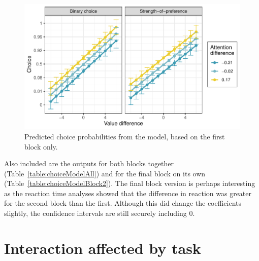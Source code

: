 \documentclass[12pt]{article}
\begin{document}




\begin{figure}
	\includegraphics{images/predictedChoiceGraph}
	\caption{Predicted choice probabilities from the model, based on the first block only.}
	\label{figure:predictedChoiceGraph}	
\end{figure}


Also included are the outputs for both blocks together (Table~\ref{table:choiceModelAll}) and for the final block on its own (Table~\ref{table:choiceModelBlock2}). The final block version is perhaps interesting as the reaction time analyses showed that the difference in reaction was greater for the second block than the first. Although this did change the coefficients slightly, the confidence intervals are still securely including 0. 

\section{Interaction affected by task}
\end{document}
